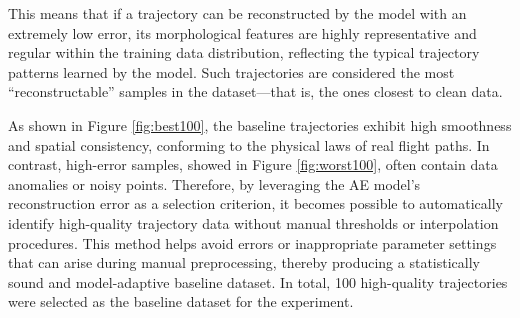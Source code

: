 This means that if a trajectory can be reconstructed by the model with an extremely low error, its morphological features are highly representative and regular within the training data distribution, reflecting the typical trajectory patterns learned by the model. Such trajectories are considered the most “reconstructable” samples in the dataset—that is, the ones closest to clean data.

As shown in Figure \ref{fig:best100}, the baseline trajectories exhibit high smoothness and spatial consistency, conforming to the physical laws of real flight paths. In contrast, high-error samples, showed in Figure \ref{fig:worst100}, often contain data anomalies or noisy points. Therefore, by leveraging the AE model’s reconstruction error as a selection criterion, it becomes possible to automatically identify high-quality trajectory data without manual thresholds or interpolation procedures. This method helps avoid errors or inappropriate parameter settings that can arise during manual preprocessing, thereby producing a statistically sound and model-adaptive baseline dataset. In total, 100 high-quality trajectories were selected as the baseline dataset for the experiment.

